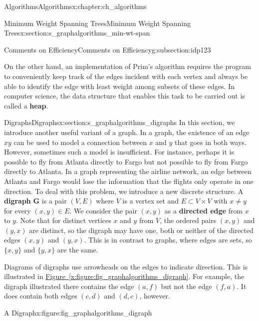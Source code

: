 \documentclass[oneside,10pt,]{book}
\newcommand{\xreffont}{\relax}
\newcommand{\terminology}[1]{\textbf{#1}}
\numberwithin{equation}{section}
\newcommand{\bfG}{\mathbf{G}}
\begin{document}
\begin{chapterptx}{Algorithms}{}{Algorithms}{}{}{x:chapter:ch_algorithms}
\begin{sectionptx}{Minimum Weight Spanning Trees}{}{Minimum Weight Spanning Trees}{}{}{x:section:s_graphalgorithms_min-wt-span}
\begin{subsectionptx}{Comments on Efficiency}{}{Comments on Efficiency}{}{}{g:subsection:idp123}
\par
On the other hand, an implementation of Prim's algorithm requires the program to conveniently keep track of the edges incident with each vertex and always be able to identify the edge with least weight among subsets of these edges. In computer science, the data structure that enables this task to be carried out is called a \terminology{heap}.%
\end{subsectionptx}
\end{sectionptx}
%
%
\typeout{************************************************}
\typeout{************************************************}
%
\begin{sectionptx}{Digraphs}{}{Digraphs}{}{}{x:section:s_graphalgorithms_digraphs}
In this section, we introduce another useful variant of a graph. In a graph, the existence of an edge \(xy\) can be used to model a connection between \(x\) and \(y\) that goes in both ways. However, sometimes such a model is insufficient. For instance, perhaps it is possible to fly from Atlanta directly to Fargo but not possible to fly from Fargo directly to Atlanta. In a graph representing the airline network, an edge between Atlanta and Fargo would lose the information that the flights only operate in one direction. To deal with this problem, we introduce a new discrete structure. A \terminology{digraph} \(\bfG\) is a pair \((V,E)\) where \(V\) is a vertex set and \(E\subset V\times V\) with \(x\neq y\) for every \((x,y)\in E\). We consider the pair \((x,y)\) as a \terminology{directed edge} from \(x\) to \(y\). Note that for distinct vertices \(x\) and \(y\) from \(V\), the ordered pairs \((x,y)\) and \((y,x)\) are distinct, so the digraph may have one, both or neither of the directed edges \((x,y)\) and \((y,x)\). This is in contrast to graphs, where edges are sets, so \(\{x,y\}\) and \(\{y,x\}\) are the same.%
\par
Diagrams of digraphs use arrowheads on the edges to indicate direction.  This is illustrated in \hyperref[x:figure:fig_graphalgorithms_digraph]{Figure~{\xreffont\ref{x:figure:fig_graphalgorithms_digraph}}}. For example, the digraph illustrated there contains the edge \((a,f)\) but not the edge \((f,a)\). It does contain both edges \((c,d)\) and \((d,c)\), however.%
\begin{figureptx}{A Digraph}{x:figure:fig_graphalgorithms_digraph}{}%
\begin{image}{0.075}{0.85}{0.075}%

\end{image}
\end{figureptx}
\end{sectionptx}
\end{chapterptx}
\end{document}

